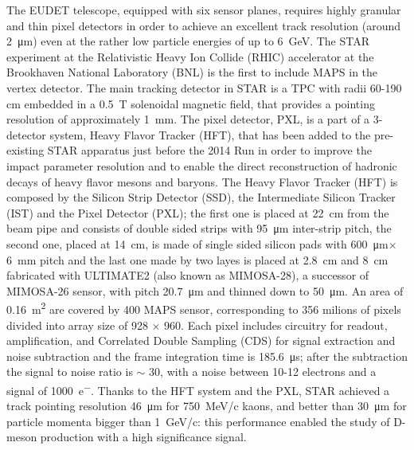         The EUDET telescope, equipped with six sensor planes, requires highly granular and thin pixel detectors in order to achieve an excellent track resolution (around \SI{2}{\um}) even at the rather low particle energies of up to \SI{6}{GeV}.
        The STAR experiment at the Relativistic Heavy Ion Collide (RHIC) accelerator at the Brookhaven National Laboratory (BNL) is the first to include MAPS in the vertex detector\cite{STAR}.
        The main tracking detector in STAR is a TPC with radii 60-190 cm  embedded in a \SI{0.5}{T} solenoidal magnetic field, that provides a pointing resolution of approximately \SI{1}{mm}. 
        The pixel detector, PXL, is a part of a 3-detector system, Heavy Flavor Tracker (HFT), that has been added to the pre-existing STAR apparatus just before the 2014 Run in order to improve the impact parameter resolution and to enable the direct reconstruction of hadronic decays of heavy flavor mesons and baryons.     
        The Heavy Flavor Tracker (HFT) is composed by the Silicon Strip Detector (SSD), the Intermediate Silicon Tracker (IST) and the Pixel Detector (PXL); the first one is placed at \SI{22}{cm} from the beam pipe and consists of double sided strips with \SI{95}{\um} inter-strip pitch, the second one, placed at \SI{14}{cm}, is made of single sided silicon pads with \SI{600}{\um}$\times$\SI{6}{mm} pitch and the last one made by two layes is placed at \SI{2.8}{cm} and \SI{8}{cm} fabricated with ULTIMATE2 (also known as MIMOSA-28), a successor of MIMOSA-26 sensor, with pitch \SI{20.7}{\um} and thinned down to \SI{50}{\um}.
        An area of \SI{0.16}{m\squared} are covered by 400 MAPS sensor, corresponding to 356 milions of pixels divided into array size of 928 $\times$ 960.
        Each pixel includes circuitry for readout, amplification, and Correlated Double Sampling (CDS) for signal extraction and noise subtraction and the frame integration time is \SI{185.6}{\us}; after the subtraction the signal to noise ratio is $\sim$ 30, with a noise between 10-12 electrons and a signal of \SI{1000}{e^-}.
        Thanks to the HFT system and the PXL, STAR achieved a track pointing resolution \SI{46}{\um} for \SI{750}{MeV/c} kaons, and better than \SI{30}{\um} for particle momenta bigger than \SI{1}{GeV/c}: this performance enabled the study of D-meson production with a high significance signal.


